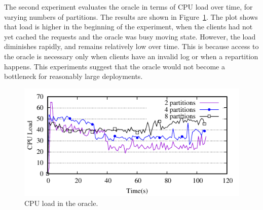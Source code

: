 The second experiment evaluates the oracle in terms of CPU load over
time, for varying numbers of partitions. The results are shown in
Figure~\ref{fig:cpu_oracle}. The plot shows that load is higher in the
beginning of the experiment, when the clients had not yet cached the
requests and the oracle was busy moving state. However, the load diminishes rapidly, and remains relatively
low over time. This is because access to the oracle is necessary only
when clients have an invalid log or when a repartition happens. This experiments
suggest that the oracle would not become a bottleneck for reasonably large
deployments.

\begin{figure}[ht]
	\includegraphics[width=\columnwidth]{figures/socc/socc-oracle-load}
	\caption{CPU load in the oracle.}
	\label{fig:cpu_oracle}
\end{figure}

